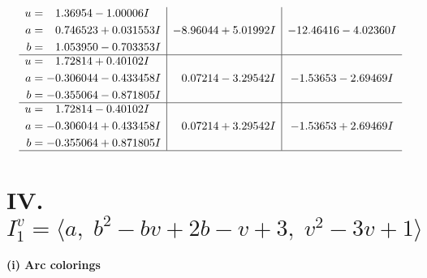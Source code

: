 \documentclass[1p]{elsarticle_modified}
\theoremstyle{definition}
\begin{document}
$$\begin{array}{c|c|c}
\begin{aligned}
u &= \phantom{-}1.36954 - 1.00006 I \\
a &= \phantom{-}0.746523 + 0.031553 I \\
b &= \phantom{-}1.053950 - 0.703353 I\end{aligned}
 & -8.96044 + 5.01992 I & -12.46416 - 4.02360 I \\ \hline\begin{aligned}
u &= \phantom{-}1.72814 + 0.40102 I \\
a &= -0.306044 - 0.433458 I \\
b &= -0.355064 - 0.871805 I\end{aligned}
 & \phantom{-}0.07214 - 3.29542 I & -1.53653 - 2.69469 I \\ \hline\begin{aligned}
u &= \phantom{-}1.72814 - 0.40102 I \\
a &= -0.306044 + 0.433458 I \\
b &= -0.355064 + 0.871805 I\end{aligned}
 & \phantom{-}0.07214 + 3.29542 I & -1.53653 + 2.69469 I\\
 \hline 
 \end{array}$$\newpage\newpage\renewcommand{\arraystretch}{1}
\centering \section*{IV. $I^v_{1}= \langle a,\;b^2- b v+2 b- v+3,\;v^2-3 v+1 \rangle$}
\flushleft \textbf{(i) Arc colorings}\\
\end{document}
